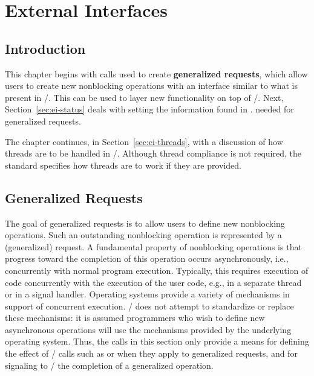 
\chapter{External Interfaces}
\label{sec:ei-2}
\label{chap:ei-2}

\section{Introduction}
\label{sec:ei-intro}

This chapter begins with calls used to
create {\bf generalized requests},
which allow users 
to create new nonblocking
operations with an interface similar to what is present in \mpi/.
This can be used to layer new functionality on top of \mpi/.  Next,
Section~\ref{sec:ei-status} deals with setting the information found
in
.  
 needed for generalized 
requests.



The chapter continues, in Section~\ref{sec:ei-threads}, with a
discussion of how threads are to be handled in 
\mpi/.  
Although thread compliance is not required, the standard specifies how threads
are to work if they are provided.  



\section{Generalized Requests}
\label{sec:ei-gr}

The goal of 
generalized requests 
is to allow users to define new
nonblocking operations.  Such an outstanding nonblocking operation is
represented by a (generalized) request.  A fundamental property of 
nonblocking operations is that progress toward the completion of this
operation occurs asynchronously, i.e., concurrently with normal program
execution.  Typically, this requires execution of code concurrently
with the execution of the user code, e.g., in a separate thread or in a
signal handler.  Operating systems provide a variety of mechanisms in
support of concurrent execution.
\MPI/ does not attempt to standardize or 
replace these mechanisms: it is assumed
programmers who wish to define new asynchronous operations will use
the  mechanisms provided by the underlying operating system. 
Thus, the calls in this section only provide a means for
defining the effect of \MPI/ calls such as  or
 when they apply to generalized requests, and for
signaling to \MPI/ the completion of a generalized operation. 

